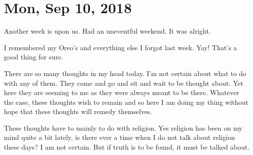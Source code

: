 \section{Mon, Sep 10, 2018}

Another week is upon us. Had an uneventful weekend. It was alright.

I remembered my Oreo's and everything else I forgot last week. Yay! That's a good
thing for sure.

There are so many thoughts in my head today. I'm not certain about what to do with
any of them. They come and go and sit and wait to be thought about. Yet here they are
seeming to me as they were always meant to be there. Whatever the case, these
thoughts wish to remain and so here I am doing my thing without hope that these
thoughts will remedy themselves.

These thoughts have to mainly to do with religion. Yes religion has been on my mind
quite a bit lately, is there ever a time when I do not talk about religion these
days? I am not certain. But if truth is to be found, it must be talked about.